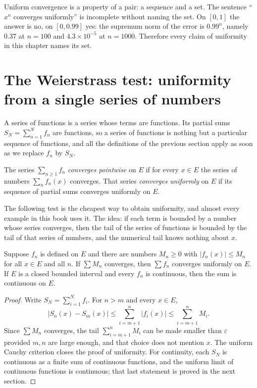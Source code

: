 \begin{catatan}
Uniform convergence is a property of a pair: a sequence and a set. The sentence
``$x^n$ converges uniformly'' is incomplete without naming the set. On
$[0,1]$ the answer is no, on $[0,0.99]$ yes: the supremum norm of the error is
$0.99^n$, namely $0.37$ at $n=100$ and $4.3\times10^{-5}$ at $n=1000$.
Therefore every claim of uniformity in this chapter names its set.
\end{catatan}

\section{The Weierstrass test: uniformity from a single series of numbers}

A series of functions is a series whose terms are functions. Its partial sums
$S_N=\sum_{n=1}^{N}f_n$ are functions, so a series of functions is nothing but a
particular sequence of functions, and all the definitions of the previous section apply
as soon as we replace $f_n$ by $S_N$.

\begin{definisi}
The series $\sum_{n\ge1}f_n$ \emph{converges pointwise} on $E$ if for
every $x\in E$ the series of numbers $\sum_n f_n(x)$ converges. That series
\emph{converges uniformly} on $E$ if its sequence of partial
sums converges uniformly on $E$.
\end{definisi}

The following test is the cheapest way to obtain uniformity, and almost every
example in this book uses it. The idea: if each term is bounded by a number
whose series converges, then the tail of the series of functions is bounded by the tail of
that series of numbers, and the numerical tail knows nothing about $x$.

\begin{teorema}
Suppose $f_n$ is defined on $E$ and there are numbers $M_n\ge0$ with
$|f_n(x)|\le M_n$ for all $x\in E$ and all $n$. If $\sum M_n$
converges, then $\sum f_n$ converges uniformly on $E$. If $E$ is a closed
bounded interval and every $f_n$ is continuous, then the sum is continuous on $E$.
\end{teorema}

\begin{proof}
Write $S_N=\sum_{i=1}^{N}f_i$. For $n>m$ and every $x\in E$,
\[
  |S_n(x)-S_m(x)|\le\sum_{i=m+1}^{n}|f_i(x)|\le\sum_{i=m+1}^{n}M_i .
\]
Since $\sum M_n$ converges, the tail $\sum_{i=m+1}^{n}M_i$ can be made smaller
than $\varepsilon$ provided $m,n$ are large enough, and that choice does not
mention $x$. The uniform Cauchy criterion closes the proof of uniformity. For
continuity, each $S_N$ is continuous as a finite sum of continuous functions, and the
uniform limit of continuous functions is continuous; that last statement is proved in
the next section.
\end{proof}

